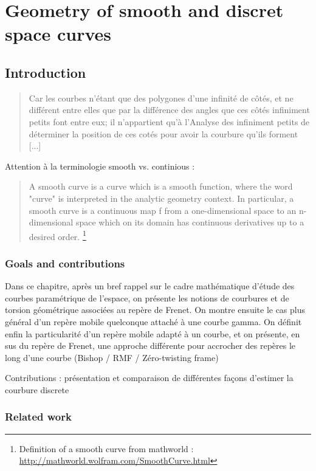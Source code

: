 \chapter{Geometry of smooth and discret space curves}
\section{Introduction}


\blockcquote[Liebniz]{}{Car les courbes n’étant que des polygones d’une infinité de côtés, et ne différent
entre elles que par la différence des angles que ces côtés infiniment petits font
entre eux; il n’appartient qu’à l’Analyse des infiniment petits de déterminer la
position de ces cotés pour avoir la courbure qu’ils forment [...]}.

Attention à la terminologie smooth vs. continious :

\blockquote{A smooth curve is a curve which is a smooth function, where the word "curve" is interpreted in the analytic geometry context. In particular, a smooth curve is a continuous map f from a one-dimensional space to an n-dimensional space which on its domain has continuous derivatives up to a desired order. \footnote{Definition of a smooth curve from mathworld : \url{http://mathworld.wolfram.com/SmoothCurve.html}}
} 

\subsection{Goals and contributions}
Dans ce chapitre, après un bref rappel sur le cadre mathématique d'étude des courbes paramétrique de l'espace, on présente les notions de courbures et de torsion géométrique associées au repère de Frenet. On montre ensuite le cas plus général d'un repère mobile quelconque attaché à une courbe gamma. On définit enfin la particularité d'un repère mobile adapté à un courbe, et on présente, en sus du repère de Frenet, une approche différente pour accrocher des repères le long d'une courbe (Bishop / RMF / Zéro-twisting frame)

Contributions : présentation et comparaison de différentes façons d'estimer la courbure discrete

\subsection{Related work}

